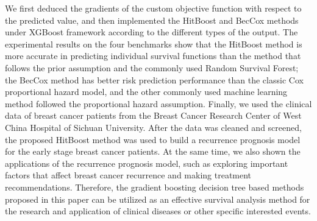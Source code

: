 \begin{englishabstract}
	We first deduced the gradients of the custom objective function with respect to the predicted value, and then implemented the HitBoost and BecCox methods under XGBoost framework according to the different types of the output. The experimental results on the four benchmarks show that the HitBoost method is more accurate in predicting individual survival functions than the method that follows the prior assumption and the commonly used Random Survival Forest; the BecCox method has better risk prediction performance than the classic Cox proportional hazard model, and the other commonly used machine learning method followed the proportional hazard assumption. Finally, we used the clinical data of breast cancer patients from the Breast Cancer Research Center of West China Hospital of Sichuan University. After the data was cleaned and screened, the proposed HitBoost method was used to build a recurrence prognosis model for the early stage breast cancer patients. At the same time, we also shown the applications of the recurrence prognosis model, such as exploring important factors that affect breast cancer recurrence and making treatment recommendations. Therefore, the gradient boosting decision tree based methods proposed in this paper can be utilized as an effective survival analysis method for the research and application of clinical diseases or other specific interested events.

\end{englishabstract}


